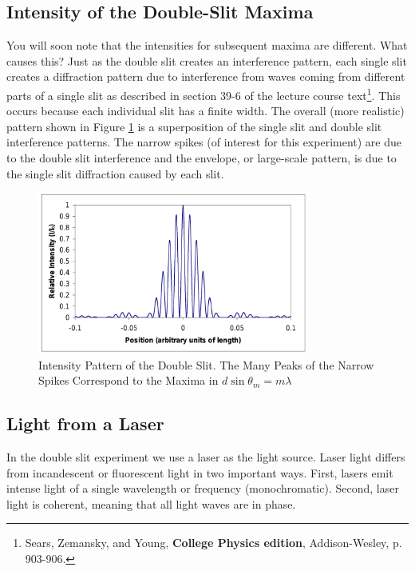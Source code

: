 \subsection{Intensity of the Double-Slit Maxima}
You will soon note that the intensities for subsequent maxima are different. What causes this? Just as the double slit creates an interference pattern, each single slit creates a diffraction pattern due to interference from waves coming from different parts of a single slit as described in section 39-6 of the lecture course text\footnote{Sears, Zemansky, and Young, \textbf{College Physics  edition}, Addison-Wesley, p. 903-906.}. This occurs because each individual slit has a finite width. The overall (more realistic) pattern shown in Figure {\ref{fig:intensity}} is a superposition of the single slit and double slit interference patterns. The narrow spikes (of interest for this experiment) are due to the double slit interference and the envelope, or large-scale pattern, is due to the single slit diffraction caused by each slit.
\begin{figure}[h]
\centering
\includegraphics[width=0.8\textwidth]{./Exp8/pic/image6.png}
\caption{Intensity Pattern of the Double Slit. The Many Peaks of the Narrow Spikes Correspond to the Maxima in $d\sin\theta_{m}=m\lambda$}
\label{fig:intensity}
\end{figure}

\subsection{Light from a Laser}
In the double slit experiment we use a laser as the light source. Laser light differs from incandescent or fluorescent light in two important ways. First, lasers emit intense light of a single wavelength or frequency (monochromatic). Second, laser light is coherent, meaning that all light waves are in phase.\myskip

